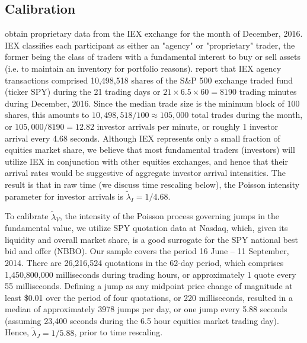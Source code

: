 \documentclass[12pt]{article}
\begin{document}
\newpage
%





\newpage
\begin{appendices}
\section{Calibration \label{Calibration}}
\label{sec:calibration}

\cite{Aldrich2017} obtain proprietary data from the IEX exchange for the month of December, 2016. IEX classifies each participant as either an "agency" or "proprietary" trader, the former being the class of traders with a fundamental interest to buy or sell assets (i.e. to maintain an inventory for portfolio reasons). \cite{Aldrich2017} report that IEX agency transactions comprised 10,498,518 shares of the S\&P 500 exchange traded fund (ticker SPY) during the 21 trading days or $21 \times 6.5 \times 60 = 8190$ trading minutes during December, 2016. Since the median trade size is the minimum block of 100 shares, this amounts to $10,498,518/100 \approx 105,000$ total trades during the month, or $105,000/8190 = 12.82$ investor arrivals per minute, or roughly 1 investor arrival every 4.68 seconds. Although IEX represents only a small fraction of equities market share, we believe that most fundamental traders (investors) will utilize IEX in conjunction with other equities exchanges, and hence that their arrival rates would be suggestive of aggregate investor arrival intensities. The result is that in raw time (we discuss time rescaling below), the Poisson intensity parameter for investor arrivals is $\tilde{\lambda}_I = 1/4.68$.

To calibrate $\tilde{\lambda}_V$, the intensity of the Poisson process governing jumps in the fundamental value, we utilize SPY quotation data at Nasdaq, which, given its liquidity and overall market share, is a good surrogate for the SPY national best bid and offer (NBBO). Our sample covers the period 16 June – 11 September, 2014. There are 26,216,524 quotations in the 62-day period, which comprises 1,450,800,000 milliseconds during trading hours, or approximately 1 quote every 55 milliseconds. Defining a jump as any midpoint price change of magnitude at least \$0.01 over the period of four quotations, or 220 milliseconds, resulted in a median of approximately 3978 jumps per day, or one jump every 5.88 seconds (assuming 23,400 seconds during the 6.5 hour equities market trading day). Hence, $\tilde{\lambda}_J = 1/5.88$, prior to time rescaling.


\end{appendices}
\end{document}
